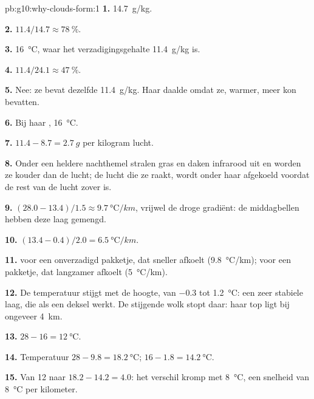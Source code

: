 \begin{solution}{pb:g10:why-clouds-form:1}
\textbf{1.} \qty{14.7}{g/kg}.

\textbf{2.} $11.4/14.7 \approx \qty{78}{\percent}$.

\textbf{3.} \qty{16}{\degreeCelsius}, waar het verzadigingsgehalte
\qty{11.4}{g/kg} is.

\textbf{4.} $11.4/24.1 \approx \qty{47}{\percent}$.

\textbf{5.} Nee: ze bevat dezelfde \qty{11.4}{g/kg}. Haar  daalde omdat ze, warmer, meer kon bevatten.

\textbf{6.} Bij haar , \qty{16}{\degreeCelsius}.

\textbf{7.} $11.4 - 8.7 = \qty{2.7}{g}$ per kilogram lucht.

\textbf{8.} Onder een heldere nachthemel stralen gras en daken infrarood uit en
worden ze kouder dan de lucht; de lucht die ze raakt, wordt onder haar 
afgekoeld voordat de rest van de lucht zover is.

\textbf{9.} $(28.0 - 13.4)/1.5 \approx \qty{9.7}{\degreeCelsius/km}$,
vrijwel de droge gradiënt: de middagbellen hebben deze laag gemengd.

\textbf{10.} $(13.4 - 0.4)/2.0 = \qty{6.5}{\degreeCelsius/km}$.

\textbf{11.}  voor een onverzadigd pakketje, dat sneller afkoelt
(\qty{9.8}{\degreeCelsius/km});  voor een  pakketje, dat
langzamer afkoelt (\qty{5}{\degreeCelsius/km}).

\textbf{12.} De temperatuur stijgt met de hoogte, van \num{-0.3} tot
\qty{1.2}{\degreeCelsius}: een zeer stabiele laag, die als een deksel werkt. De
stijgende wolk stopt daar: haar top ligt bij ongeveer \qty{4}{km}.

\textbf{13.} $28 - 16 = \qty{12}{\degreeCelsius}$.

\textbf{14.} Temperatuur $28 - 9.8 = \qty{18.2}{\degreeCelsius}$; 
$16 - 1.8 = \qty{14.2}{\degreeCelsius}$.

\textbf{15.} Van 12 naar $18.2 - 14.2 = 4.0$: het verschil kromp met
\qty{8}{\degreeCelsius}, een snelheid van \qty{8}{\degreeCelsius} per kilometer.


\end{solution}
